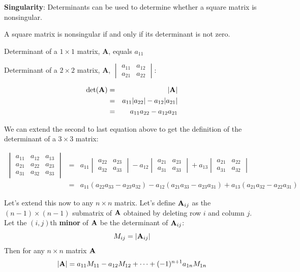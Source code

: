 \documentclass[]{book}
\theoremstyle{definition}
\theoremstyle{definition}
\theoremstyle{definition}
\theoremstyle{remark}
\begin{document}
\textbf{Singularity}: Determinants can be used to determine whether a square matrix is nonsingular.

A square matrix is nonsingular if and only if its determinant is not zero.

Determinant of a \(1 \times 1\) matrix, \textbf{A}, equals \(a_{11}\)

Determinant of a \(2 \times 2\) matrix, \textbf{A},
\(\begin{vmatrix} a_{11}&a_{12}\\  a_{21}&a_{22} \end{vmatrix}\):

\begin{eqnarray*}
\det({\bf A}) &=& |{\bf A}|\\
            &=& a_{11}|a_{22}| - a_{12}|a_{21}|\\
            &=& a_{11}a_{22} - a_{12}a_{21}
\end{eqnarray*}

We can extend the second to last equation above to get the definition of the determinant of a \(3 \times 3\) matrix:

\begin{eqnarray*}
            \begin{vmatrix} a_{11}&a_{12}&a_{13}\\  a_{21} & a_{22}&a_{23}\\ a_{31}&a_{32}&a_{33} \end{vmatrix} 
                &=& 
                a_{11} \begin{vmatrix} a_{22}&a_{23}\\ a_{32}&a_{33} \end{vmatrix}
                - a_{12} \begin{vmatrix} a_{21}&a_{23}\\ a_{31}&a_{33} \end{vmatrix}
                + a_{13} \begin{vmatrix} a_{21}&a_{22}\\ a_{31}&a_{32} 
                \end{vmatrix}\\
                &=& a_{11}(a_{22}a_{33} - a_{23}a_{32}) - a_{12}(a_{21}a_{33} - a_{23}a_{31}) + a_{13}(a_{21}a_{32} - a_{22}a_{31})
\end{eqnarray*}

Let's extend this now to any \(n\times n\) matrix. Let's define \({\bf A}_{ij}\) as the \((n-1)\times (n-1)\) submatrix of \({\bf A}\) obtained by deleting row \(i\) and column \(j\). Let the \((i,j)\)th \textbf{minor} of \({\bf A}\) be the determinant of \({\bf A}_{ij}\):
\[M_{ij}=|{\bf A}_{ij}|\]
Then for any \(n\times n\) matrix \({\bf A}\)
\[|{\bf A}|= a_{11}M_{11} - a_{12}M_{12} + \cdots + (-1)^{n+1} a_{1n} M_{1n}\]
\end{document}
